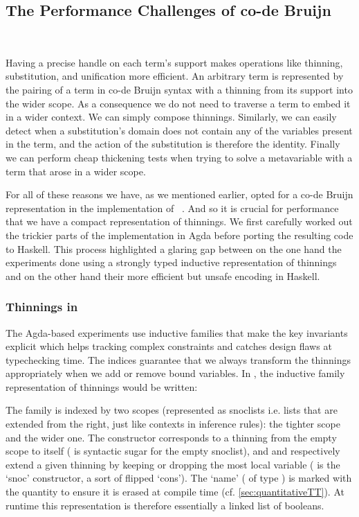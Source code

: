 \subsection{The Performance Challenges of co-de Bruijn}~\label{sec:thinningsintypos}

Having a precise handle on each term's support makes operations like thinning,
substitution, and unification more efficient.
%
An arbitrary term is represented by the pairing of a term in co-de Bruijn syntax
with a thinning from its support into the wider scope.
%
As a consequence we do not need to traverse a term to embed it in a wider context.
We can simply compose thinnings.
%
Similarly, we can easily detect when a substitution's domain does not contain any
of the variables present in the term, and the action of the substitution is therefore
the identity.
%
Finally we can perform cheap thickening tests when trying to solve a metavariable with
a term that arose in a wider scope.

For all of these reasons we have, as we mentioned earlier, opted for a co-de Bruijn
representation in the implementation of \typos~\cite{MANUAL:talk/types/Allais22}.
%
And so it is crucial for performance that we have a compact representation of thinnings.
%
We first carefully worked out the trickier parts of the implementation in Agda before
porting the resulting code to Haskell.
%
This process highlighted a glaring gap between on the one hand the experiments done
using a strongly typed inductive representation of thinnings and on the other hand
their more efficient but unsafe encoding in Haskell.

\subsubsection{Thinnings in \typos}

The Agda-based experiments use inductive families that make the key invariants
explicit which helps tracking complex constraints and catches design flaws at
typechecking time.
%
The indices guarantee that we always transform the thinnings appropriately when
we add or remove bound variables. In \idris{}, the inductive family representation
of thinnings would be written:

%
The  family is indexed by two scopes (represented as snoclists
i.e. lists that are extended from the right, just like contexts in inference rules):
 the tighter scope and  the wider one.
%
The  constructor corresponds to a thinning from the empty scope to
itself (\IdrisData{[<]} is \idris{} syntactic sugar for the empty snoclist),
and  and  respectively extend a given thinning
by keeping or dropping the most local variable (\IdrisData{:<} is the `snoc'
constructor, a sort of flipped `cons').
%
The `name' ( of type ) is marked with the quantity
 to ensure it is erased at compile time (cf. \cref{sec:quantitativeTT}).
%
At runtime this representation is therefore essentially a linked list of booleans.

